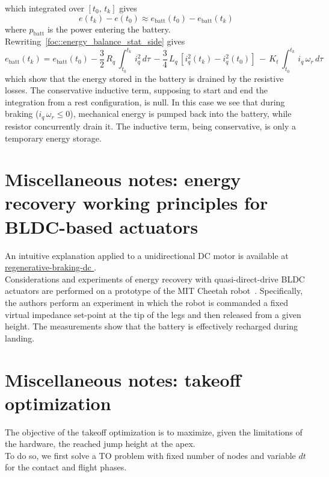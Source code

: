 \documentclass[letterpaper, 10 pt, conference]{ieeeconf}  %
\begin{document}
which integrated over $\left[t_0,\,t_k\right]$ gives
\begin{equation}
e(t_k) - e(t_0) \approx e_{\mathrm{batt}}(t_0) - e_{\mathrm{batt}}(t_k)
\end{equation}
where $p_{\mathrm{batt}}$ is the power entering the battery. \\
Rewriting~\eqref{foc::energy_balance_stat_side} gives
\begin{dmath}\label{foc::energy_balance_batt_side}
	e_{\mathrm{batt}}(t_k) = e_{\mathrm{batt}}(t_0)- \dfrac{3}{2}\,R_{q}\,\int_{t_0}^{t_k}\,i_{q}^2\,d\tau\,- \dfrac{3}{4}\,L_q\,\left[i_q^2(t_k) - i_q^2(t_0)\right]\,-\,K_t\,\int_{t_0}^{t_k}\,i_q\,\omega_{r}\,d\tau
\end{dmath}
which show that the energy stored in the battery is drained by the resistive losses. The conservative inductive term, supposing to start and end the integration from a rest configuration, is null. In this case we see that during braking ($i_q\,\omega_r \leq 0$), mechanical energy is pumped back into the battery, while resistor concurrently drain it. The inductive term, being conservative, is only a temporary energy storage.
\section{Miscellaneous notes: energy recovery working principles for BLDC-based actuators}\label{section::energy_recovery_formulation_bldc}
An intuitive explanation applied to a unidirectional DC motor is available at  \href{https://electronics.stackexchange.com/questions/56186/how-can-i-implement-regenerative-braking-of-a-dc-motor}{\color{blue} regenerative-braking-dc \color{black}}.\\
Considerations and experiments of energy recovery with quasi-direct-drive BLDC actuators are performed on a prototype of the MIT Cheetah robot~\cite{reg_braking::seok2014design}. Specifically, the authors perform an experiment in which the robot is commanded a fixed virtual impedance set-point at the tip of the legs and then released from a given height. The measurements show that the battery is effectively recharged during landing.
\clearpage
\section{Miscellaneous notes: takeoff optimization}\label{section::takeoff_opt_formulation}
The objective of the takeoff optimization is to maximize, given the limitations of the hardware, the reached jump height at the apex. \\
To do so, we first solve a TO problem with fixed number of nodes and variable $dt$ for the contact and flight phases.
\clearpage
\end{document}

